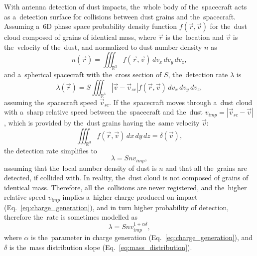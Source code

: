 With antenna detection of dust impacts, the~whole body of the~spacecraft acts as a~detection surface for collisions between dust grains and the~spacecraft. Assuming a~6D phase space probability density function $f(\vec{r},\vec{v})$ for the~dust cloud composed of grains of identical mass, where $\vec{r}$ is the~location and $\vec{v}$ is the~velocity of the~dust, and normalized to dust number density $n$ as
\begin{equation}
    n(\vec{r}) = \iiint_{\mathbb{R}^3} f(\vec{r},\vec{v}) \,dv_x\,dv_y\,dv_z,
\end{equation}
and a~spherical spacecraft with the~cross section of $S$, the~detection rate $\lambda$ is
\begin{equation}
    \lambda(\vec{r}) = S \iiint_{\mathbb{R}^3} |\vec{v}-\vec{v}_{sc}| f(\vec{r},\vec{v})  \,dv_x\,dv_y\,dv_z, \label{eq:phase_space_lambda}
\end{equation}
assuming the~spacecraft speed $\vec{v}_{sc}$. If the~spacecraft moves through a~dust cloud with a~sharp relative speed between the~spacecraft and the~dust $v_{imp}=|\vec{v}_{sc}-\vec{v}|$, which is provided by the~dust grains having the~same velocity $\vec{v}$:
\begin{equation}
    \iiint_{\mathbb{R}^3} f(\vec{r},\vec{v}) \,dx\,dy\,dz = \delta(\vec{v}),
\end{equation}
the detection rate simplifies to  
\begin{equation}
    \lambda = S n v_{imp},
\end{equation}
assuming that the~local number density of dust is $n$ and that all the~grains are detected, if collided with. In reality, the~dust cloud is not composed of grains of identical mass. Therefore, all the~collisions are never registered, and the~higher relative speed $v_{imp}$ implies a~higher charge produced on impact (Eq.~\ref{eq:charge_generation}), and in turn higher probability of detection, therefore the~rate is sometimes modelled as
\begin{equation}
    \lambda = S n v_{imp}^{1+\alpha \delta}, \label{eq:rate_semi_general}
\end{equation}
where $\alpha$ is the~parameter in charge generation (Eq.~\ref{eq:charge_generation}), and $\delta$ is the~mass distribution slope (Eq.~\ref{eq:mass_distribution}). 

